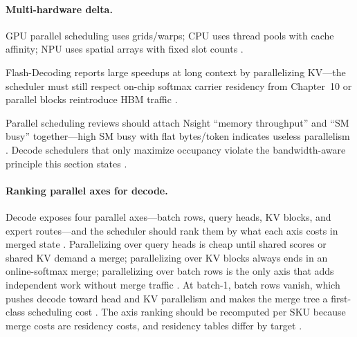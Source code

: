 \paragraph{Multi-hardware delta.} GPU parallel scheduling uses grids/warps; CPU uses thread pools with cache affinity; NPU uses spatial arrays with fixed slot counts \citep{nvidia2022hopper,amd2024xdna,dlbook,chen2020compilerbasedhardw,yirage2026,patel2025llminference,taxbreak2026,memoryfloor2026,kwon2023vllm,liu2024deepseekv3,dao2022flashattention,semianalysis2024tma,dao2023flashdecoding,nvidia2024cudagraphs,amd2024aie}.

\begin{example}
Flash-Decoding reports large speedups at long context by parallelizing KV---the scheduler must still respect on-chip softmax carrier residency from Chapter~10 or parallel blocks reintroduce HBM traffic \citep{dao2023flashdecoding,dao2022flashattention,yirage2026,memoryfloor2026,taxbreak2026,patel2025llminference,chen2020compilerbasedhardw,amd2024xdna,semianalysis2024tma,dlbook,kwon2023vllm,liu2024deepseekv3,nvidia2022hopper,nvidia2024cudagraphs,amd2024aie}.
\end{example}

Parallel scheduling reviews should attach Nsight ``memory throughput'' and ``SM busy'' together---high SM busy with flat bytes/token indicates useless parallelism \citep{memoryfloor2026,semianalysis2024tma,patel2025llminference,taxbreak2026,yirage2026,chen2020compilerbasedhardw,dao2022flashattention,dao2023flashdecoding,dlbook,amd2024xdna,amd2024aie,kwon2023vllm,liu2024deepseekv3,nvidia2022hopper,nvidia2024cudagraphs}. Decode schedulers that only maximize occupancy violate the bandwidth-aware principle this section states \citep{memoryfloor2026,taxbreak2026,patel2025llminference}.

\paragraph{Ranking parallel axes for decode.}
Decode exposes four parallel axes---batch rows, query heads, KV blocks, and expert routes---and the scheduler should rank them by what each axis costs in merged state \citep{dao2023flashdecoding,kwon2023vllm,liu2024deepseekv3}. Parallelizing over query heads is cheap until shared scores or shared KV demand a merge; parallelizing over KV blocks always ends in an online-softmax merge; parallelizing over batch rows is the only axis that adds independent work without merge traffic \citep{dao2022flashattention,patel2025llminference}. At batch-1, batch rows vanish, which pushes decode toward head and KV parallelism and makes the merge tree a first-class scheduling cost \citep{taxbreak2026,memoryfloor2026}. The axis ranking should be recomputed per SKU because merge costs are residency costs, and residency tables differ by target \citep{amd2024xdna,yirage2026,chen2020compilerbasedhardw}.

